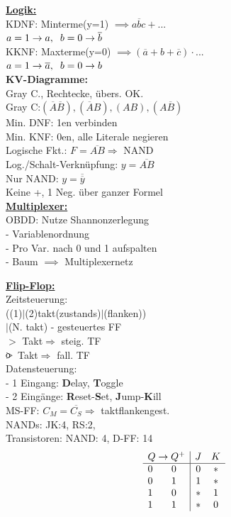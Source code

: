 \documentclass[8pt]{extarticle}
\begin{document}
\begin{minipage}{0.33\textwidth}


\underline{\textbf{Logik:}}\\
KDNF: Minterme(y=1) $\implies a\overline{b}c + ...$\\
\phantom{sssi} $a=1 \to a, \hspace{2mm} b=0 \to \overline{b}$ \\
KKNF: Maxterme(y=0) $\implies (\overline{a}+b+\overline{c}) \cdot ...$\\
\phantom{sssi} $a=1 \to \overline{a}, \hspace{2mm} b=0 \to b$ \\

\textbf{KV-Diagramme:}\\
Gray C., Rechtecke, übers. OK.\\
Gray C:$(\overline{A} \overline{B}), (\overline{A}B), (AB), (A\overline{B})$\\
Min. DNF: 1en verbinden\\
Min. KNF: 0en, alle Literale negieren\\
Logische Fkt.: $F = \overline{AB} \Rightarrow $ NAND \\
Log./Schalt-Verknüpfung: $y = \overline{AB} $\\
Nur NAND: $y = \overline{\overline{y}}$ \\
\phantom{sssi} Keine +, 1 Neg. über ganzer Formel\\


\underline{\textbf{Multiplexer:}}\\
OBDD: Nutze Shannonzerlegung\\
- Variablenordnung \\
- Pro Var. nach 0 und 1 aufspalten \\
- Baum $\implies$ Multiplexernetz

\underline{\textbf{Flip-Flop:}}\\
Zeitsteuerung:\\ ((1)$|$(2)takt(zustands)$|$(flanken))\\$|$(N. takt) - gesteuertes FF\\
$>$ Takt$\Rightarrow$ steig. TF\\
$\rlap{o}{>}$ Takt$\Rightarrow$ fall. TF\\
Datensteuerung:\\
- 1 Eingang: \textbf{D}elay, \textbf{T}oggle \\
- 2 Eingänge: \textbf{R}eset-\textbf{S}et, \textbf{J}ump-\textbf{K}ill \\
MS-FF: $C_M= \overline{C_S} \Rightarrow $ taktflankengest.\\
NANDs: JK:4, RS:2,\\
Transistoren: NAND: 4, D-FF: 14 \\
\[
\begin{array}{cc|cc}
    \multicolumn{2}{c|}{Q \to Q^+} & J & K \\
    \hline
    0 & 0 & 0 & * \\
    0 & 1 & 1 & * \\
    1 & 0 & * & 1 \\
    1 & 1 & * & 0
\end{array}
\] \\

\end{minipage}
\end{document}
